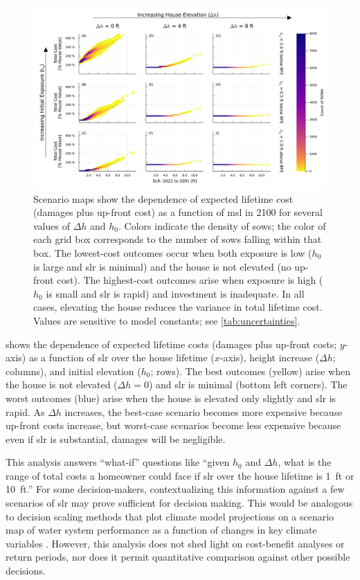 \documentclass[12pt]{article}
\makeatletter
\DeclareRobustCommand\onedot{\futurelet\@let@token\@onedot}
\def\@onedot{\ifx\@let@token.\else.\null\fi\xspace}
\def\eg{\emph{e.g}\onedot} \def\Eg{\emph{E.g}\onedot}
\DeclareRobustCommand\onedot{\futurelet\@let@token\@onedot}
\def\@onedot{\ifx\@let@token.\else.\null\fi\xspace}
\def\eg{\emph{e.g}\onedot} \def\Eg{\emph{E.g}\onedot}
\makeatother
\begin{document}
\begin{figure}
    \includegraphics[width=\textwidth]{scenario-map-slr-cost}
    \caption{
        Scenario maps show the dependence of expected lifetime cost (damages plus up-front cost) as a function of \gls{msl} in 2100 for several values of $\Delta h$ and $h_0$.
        Colors indicate the density of \glspl{sow}; the color of each grid box corresponds to the number of \glspl{sow} falling within that box.
        The lowest-cost outcomes occur when both exposure is low ($h_0$ is large and \gls{slr} is minimal) and the house is not elevated (no up-front cost).
        The highest-cost outcomes arise when exposure is high ($h_0$ is small and \gls{slr} is rapid) and investment is inadequate.
        In all cases, elevating the house reduces the variance in total lifetime cost.
        Values are sensitive to model constants; see \cref{tab:uncertainties}.
    }\label{fig:scenario-map-slr-cost}
\end{figure}

 shows the dependence of expected lifetime costs (damages plus up-front costs; $y$-axis) as a function of  \gls{slr} over the house lifetime ($x$-axis), height increase ($\Delta h$; columns), and initial elevation ($h_0$; rows).
The best outcomes (yellow) arise when the house is not elevated ($\Delta h = 0$) and \gls{slr} is minimal (bottom left corners).
The worst outcomes (blue) arise when the house is elevated only slightly and \gls{slr} is rapid.
As $\Delta h$ increases, the best-case scenario becomes more expensive because up-front costs increase, but worst-case scenarios become less expensive because even if \gls{slr} is substantial, damages will be negligible.

This analysis answers ``what-if'' questions like ``given $h_0$ and $\Delta h$, what is the range of total costs a homeowner could face if \gls{slr} over the house lifetime is \SI{1}{ft} or \SI{10}{ft}.''
For some decision-makers, contextualizing this information against a few scenarios of \gls{slr} \citep[\eg, those of][]{sweet_slr:2022} may prove sufficient for decision making.
This would be analogous to decision scaling methods that plot climate model projections on a scenario map of water system performance as a function of changes in key climate variables \citep{Brown:2012kb,Steinschneider:2015kk}.
However, this analysis does not shed light on cost-benefit analyses or return periods, nor does it permit quantitative comparison against other possible decisions.
\end{document}
